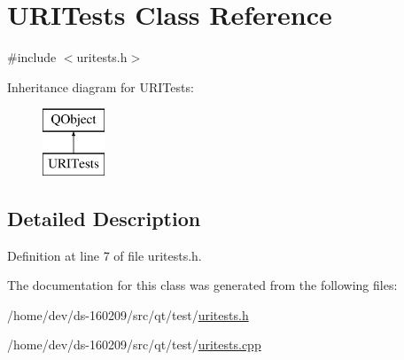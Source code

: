 \hypertarget{class_u_r_i_tests}{}\section{U\+R\+I\+Tests Class Reference}
\label{class_u_r_i_tests}


{\ttfamily \#include $<$uritests.\+h$>$}

Inheritance diagram for U\+R\+I\+Tests\+:\begin{figure}[H]
\begin{center}
\leavevmode
\includegraphics[height=2.000000cm]{class_u_r_i_tests}
\end{center}
\end{figure}


\subsection{Detailed Description}


Definition at line 7 of file uritests.\+h.



The documentation for this class was generated from the following files\+:\begin{DoxyCompactItemize}
\item 
/home/dev/ds-\/160209/src/qt/test/\hyperlink{uritests_8h}{uritests.\+h}\item 
/home/dev/ds-\/160209/src/qt/test/\hyperlink{uritests_8cpp}{uritests.\+cpp}\end{DoxyCompactItemize}
